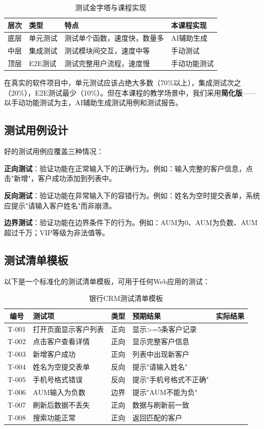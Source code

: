 \begin{table}[H]
\centering
\begin{tabular}{lp{3.5cm}p{3.5cm}p{3cm}}
\toprule
\textbf{层次} & \textbf{类型} & \textbf{特点} & \textbf{本课程实现} \\
\midrule
底层 & 单元测试 & 测试单个函数，速度快，数量多 & AI辅助生成 \\
中层 & 集成测试 & 测试模块间交互，速度中等 & 手动测试 \\
顶层 & E2E测试 & 测试完整用户流程，速度慢 & 手动功能测试 \\
\bottomrule
\end{tabular}
\caption{测试金字塔与课程实现}
\end{table}

在真实的软件项目中，单元测试应该占绝大多数（70\%以上），集成测试次之（20\%），E2E测试最少（10\%）。但在本课程的教学场景中，我们采用\textbf{简化版}——以手动功能测试为主，AI辅助生成测试用例和测试报告。

\subsection{测试用例设计}

好的测试用例应覆盖三种情况：

\textbf{正向测试}：验证功能在正常输入下的正确行为。例如：输入完整的客户信息，点击"新增"，客户成功添加到列表中。

\textbf{反向测试}：验证功能在异常输入下的容错行为。例如：姓名为空时提交表单，系统应提示"请输入客户姓名"而非崩溃。

\textbf{边界测试}：验证功能在边界条件下的行为。例如：AUM为0、AUM为负数、AUM超过千万；VIP等级为非法值等。

\subsection{测试清单模板}

以下是一个标准化的测试清单模板，可用于任何Web应用的测试：

\begin{table}[H]
\centering
\small
\begin{tabular}{cllll}
\toprule
\textbf{编号} & \textbf{测试项} & \textbf{类型} & \textbf{预期结果} & \textbf{实际结果} \\
\midrule
T-001 & 打开页面显示客户列表 & 正向 & 显示>=5条客户记录 & \\
T-002 & 点击客户查看详情 & 正向 & 显示完整客户信息 & \\
T-003 & 新增客户成功 & 正向 & 列表中出现新客户 & \\
T-004 & 姓名为空提交表单 & 反向 & 提示"请输入姓名" & \\
T-005 & 手机号格式错误 & 反向 & 提示"手机号格式不正确" & \\
T-006 & AUM输入为负数 & 边界 & 提示"AUM不能为负" & \\
T-007 & 刷新后数据不丢失 & 正向 & 数据与刷新前一致 & \\
T-008 & 搜索功能正常 & 正向 & 返回匹配的客户 & \\
\bottomrule
\end{tabular}
\caption{银行CRM测试清单模板}
\end{table}

